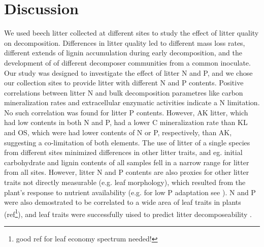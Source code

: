 \section*{Discussion}

We used beech litter collected at different sites to study the effect of litter quality on decomposition. Differences in litter quality led to different mass loss rates, different extends of lignin accumulation during early decomposition, and the development of of different decomposer communities from a common inoculate. Our study was designed to investigate the effect of litter N and P, and we chose our collection sites to provide litter with different N and P contents. Positive correlations between litter N and bulk decomposition parametres like carbon mineralization rates and extracellular enzymatic activities indicate a N limitation. No such correlation was found for litter P contents. However, AK litter, which had low contents in both N and P, had a lower C mineralization rate than KL and OS, which were had lower contents of N or P, respectively, than AK, suggesting a co-limitation of both elements. The use of litter of a single species from different sites minimized differences in other 
litter traits, and eg. initial carbohydrate and lignin contents of all samples fell in a narrow range for litter from all sites. However, litter N and P contents are also proxies for other litter traits not directly measurable (e.g. leaf morphology), which resulted from the plant’s response to nutrient availability (e.g. for low P adaptation see \cite{Vence2003}). N and P were also demostrated to be correlated to a wide area of leaf traits in plants (ref\footnote{good ref for leaf economy spectrum needed!}), and leaf traits were successfully uised to predict litter decomposeability \cite{Cornelissen1997}. %

